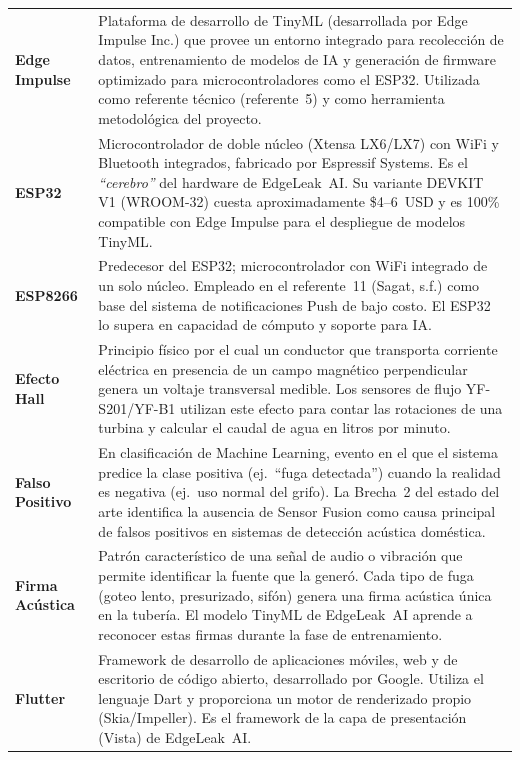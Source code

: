\documentclass[12pt,a4paper]{article}
\begin{document}
\begin{longtable}{>{\bfseries}p{3.8cm} p{10.5cm}}
Edge Impulse & Plataforma de desarrollo de TinyML (desarrollada por Edge Impulse Inc.)
que provee un entorno integrado para recolección de datos, entrenamiento de modelos de
IA y generación de firmware optimizado para microcontroladores como el ESP32. Utilizada
como referente técnico (referente~5) y como herramienta metodológica del proyecto.
\\[0.5em]

ESP32 & Microcontrolador de doble núcleo (Xtensa LX6/LX7) con WiFi y Bluetooth
integrados, fabricado por Espressif Systems. Es el \textit{``cerebro''} del hardware
de EdgeLeak~AI. Su variante DEVKIT V1 (WROOM-32) cuesta aproximadamente \$4--6~USD y
es 100\% compatible con Edge Impulse para el despliegue de modelos TinyML.
\\[0.5em]

ESP8266 & Predecesor del ESP32; microcontrolador con WiFi integrado de un solo núcleo.
Empleado en el referente~11 (Sagat, s.f.) como base del sistema de notificaciones Push
de bajo costo. El ESP32 lo supera en capacidad de cómputo y soporte para IA.
\\[0.5em]

Efecto Hall & Principio físico por el cual un conductor que transporta corriente eléctrica
en presencia de un campo magnético perpendicular genera un voltaje transversal medible.
Los sensores de flujo YF-S201/YF-B1 utilizan este efecto para contar las rotaciones de
una turbina y calcular el caudal de agua en litros por minuto.
\\[0.5em]

Falso Positivo & En clasificación de Machine Learning, evento en el que el sistema predice
la clase positiva (ej.\ ``fuga detectada'') cuando la realidad es negativa (ej.\ uso
normal del grifo). La Brecha~2 del estado del arte identifica la ausencia de Sensor
Fusion como causa principal de falsos positivos en sistemas de detección acústica
doméstica.
\\[0.5em]

Firma Acústica & Patrón característico de una señal de audio o vibración que permite
identificar la fuente que la generó. Cada tipo de fuga (goteo lento, presurizado, sifón)
genera una firma acústica única en la tubería. El modelo TinyML de EdgeLeak~AI aprende
a reconocer estas firmas durante la fase de entrenamiento.
\\[0.5em]

Flutter & Framework de desarrollo de aplicaciones móviles, web y de escritorio de código
abierto, desarrollado por Google. Utiliza el lenguaje Dart y proporciona un motor de
renderizado propio (Skia/Impeller). Es el framework de la capa de presentación (Vista)
de EdgeLeak~AI.
\\[0.5em]


\end{longtable}
\end{document}
